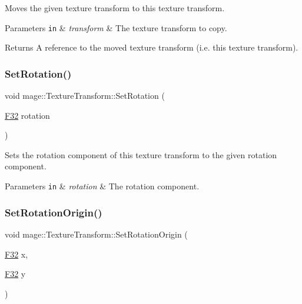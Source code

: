 Moves the given texture transform to this texture transform.


\begin{DoxyParams}[1]{Parameters}
\mbox{\tt in}  & {\em transform} & The texture transform to copy. \\
\hline
\end{DoxyParams}
\begin{DoxyReturn}{Returns}
A reference to the moved texture transform (i.\+e. this texture transform). 
\end{DoxyReturn}
\hypertarget{classmage_1_1_texture_transform_aadf399acb4be8b747e71224a3e1f723c}{}\label{classmage_1_1_texture_transform_aadf399acb4be8b747e71224a3e1f723c} 
\subsubsection{\texorpdfstring{Set\+Rotation()}{SetRotation()}}
{\footnotesize\ttfamily void mage\+::\+Texture\+Transform\+::\+Set\+Rotation (\begin{DoxyParamCaption}\item[{\hyperlink{namespacemage_aa97e833b45f06d60a0a9c4fc22ae02c0}{F32}}]{rotation }\end{DoxyParamCaption})\hspace{0.3cm}{\ttfamily [noexcept]}}

Sets the rotation component of this texture transform to the given rotation component.


\begin{DoxyParams}[1]{Parameters}
\mbox{\tt in}  & {\em rotation} & The rotation component. \\
\hline
\end{DoxyParams}
\hypertarget{classmage_1_1_texture_transform_a86667569140479a6b7bf6e1987f88c7c}{}\label{classmage_1_1_texture_transform_a86667569140479a6b7bf6e1987f88c7c} 
\subsubsection{\texorpdfstring{Set\+Rotation\+Origin()}{SetRotationOrigin()}\hspace{0.1cm}{\footnotesize\ttfamily [1/3]}}
{\footnotesize\ttfamily void mage\+::\+Texture\+Transform\+::\+Set\+Rotation\+Origin (\begin{DoxyParamCaption}\item[{\hyperlink{namespacemage_aa97e833b45f06d60a0a9c4fc22ae02c0}{F32}}]{x,  }\item[{\hyperlink{namespacemage_aa97e833b45f06d60a0a9c4fc22ae02c0}{F32}}]{y }\end{DoxyParamCaption})\hspace{0.3cm}{\ttfamily [noexcept]}}

